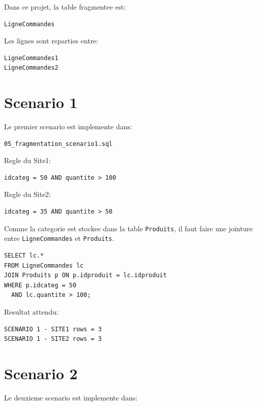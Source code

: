 \documentclass[12pt,a4paper]{report}
\begin{document}
Dans ce projet, la table fragmentee est:

\begin{lstlisting}[style=textstyle]
LigneCommandes
\end{lstlisting}

Les lignes sont reparties entre:

\begin{lstlisting}[style=textstyle]
LigneCommandes1
LigneCommandes2
\end{lstlisting}

\section{Scenario 1}

Le premier scenario est implemente dans:

\begin{lstlisting}[style=textstyle]
05_fragmentation_scenario1.sql
\end{lstlisting}

Regle du Site1:

\begin{lstlisting}[style=textstyle]
idcateg = 50 AND quantite > 100
\end{lstlisting}

Regle du Site2:

\begin{lstlisting}[style=textstyle]
idcateg = 35 AND quantite > 50
\end{lstlisting}

Comme la categorie est stockee dans la table \texttt{Produits}, il faut faire une jointure entre \texttt{LigneCommandes} et \texttt{Produits}.

\begin{lstlisting}[style=sqlstyle]
SELECT lc.*
FROM LigneCommandes lc
JOIN Produits p ON p.idproduit = lc.idproduit
WHERE p.idcateg = 50
  AND lc.quantite > 100;
\end{lstlisting}

Resultat attendu:

\begin{lstlisting}[style=textstyle]
SCENARIO 1 - SITE1 rows = 3
SCENARIO 1 - SITE2 rows = 3
\end{lstlisting}

\section{Scenario 2}

Le deuxieme scenario est implemente dans:
\end{document}
